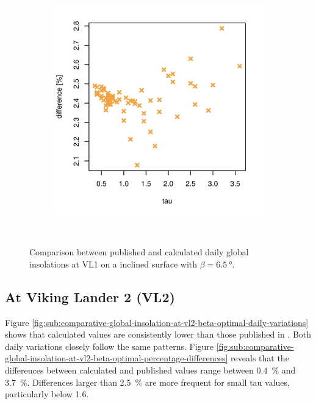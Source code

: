 \begin{figure}[H]
\begin{subfigure}[t]{\subfigureWidth}
            \label{fig:sub:comparative-global-insolation-at-vl1-beta-optimal-daily-variations}
    \end{subfigure}\hfill
    \begin{subfigure}[t]{\subfigureWidth}
        \centering
            \includegraphics[height=\graphicsHeight]{sections/appendix/A/plots/h-diff-bet-exp-calc-at-vl1-with-beta-65-deg.png}
            \label{fig:sub:comparative-global-insolation-at-vl1-beta-optimal-percentage-differences}
    \end{subfigure}\\[0.8ex]
    \caption{Comparison between published and calculated daily global insolations at \ac{VL1} on a inclined surface with $\beta=\SI{6.5}{\degree}$.}
    \label{fig:plot:comparative-global-insolation-at-vl1-beta-optimal}
\vspace{-2ex}
\end{figure}

\subsection{At Viking Lander 2 (VL2)}
Figure \ref{fig:sub:comparative-global-insolation-at-vl2-beta-optimal-daily-variations} shows that calculated values are consistently lower than those published in . Both daily variations closely follow the same patterns. Figure \ref{fig:sub:comparative-global-insolation-at-vl2-beta-optimal-percentage-differences} reveals that the differences between calculated and published values range between \SI{0.4}{\percent} and \SI{3.7}{\percent}. Differences larger than \SI{2.5}{\percent} are more frequent for small tau values, particularly below 1.6.

